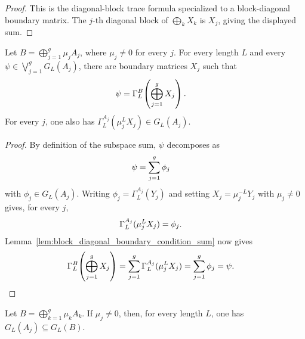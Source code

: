 \begin{proof}
    \leanok
    This is the diagonal-block trace formula specialized to a block-diagonal
    boundary matrix. The $j$-th diagonal block of $\bigoplus_kX_k$ is $X_j$,
    giving the displayed sum.
\end{proof}

\begin{lemma}
    \label{lem:block_diagonal_boundary_of_open_boundary_sum}
    \leanok
    Let $B=\bigoplus_{j=1}^g\mu_jA_j$, where $\mu_j\ne0$ for every $j$.
    For every length $L$ and every
    $\psi\in\bigvee_{j=1}^gG_L(A_j)$, there are boundary matrices $X_j$ such
    that
    \begin{align}
        \psi
         & =\Gamma_L^B\!\left(\bigoplus_{j=1}^gX_j\right).
        \notag
    \end{align}
    For every $j$, one also has
    $\Gamma_L^{A_j}(\mu_j^LX_j)\in G_L(A_j)$.
\end{lemma}

\begin{proof}
    \leanok
    By definition of the subspace sum, $\psi$ decomposes as
    \begin{align}
        \psi
         & =\sum_{j=1}^g\phi_j
        \notag
    \end{align}
    with $\phi_j\in G_L(A_j)$. Writing $\phi_j=\Gamma_L^{A_j}(Y_j)$ and setting
    $X_j=\mu_j^{-L}Y_j$ with $\mu_j\ne0$ gives, for every $j$,
    \begin{align}
        \Gamma_L^{A_j}(\mu_j^LX_j)
         & =\phi_j.
        \notag
    \end{align}
    Lemma~\ref{lem:block_diagonal_boundary_condition_sum} now gives
    \begin{align}
        \Gamma_L^B\!\left(\bigoplus_{j=1}^gX_j\right)
         & =\sum_{j=1}^g\Gamma_L^{A_j}(\mu_j^LX_j)
        =\sum_{j=1}^g\phi_j
        =\psi.
        \notag
    \end{align}
\end{proof}

\begin{lemma}
    \label{lem:local_ground_space_block_le_assembled}
    \leanok
    Let $B=\bigoplus_{k=1}^g\mu_kA_k$. If $\mu_j\ne0$, then, for every length
    $L$, one has $G_L(A_j)\subseteq G_L(B)$.
\end{lemma}

